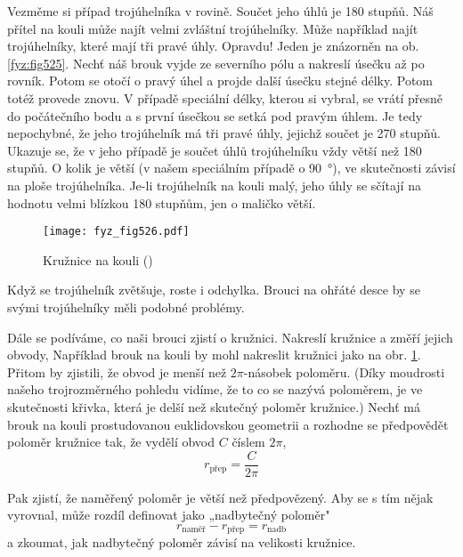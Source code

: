     Vezměme si případ trojúhelníka v rovině. Součet jeho úhlů je \num{180} stupňů. Náš přítel na 
    kouli může najít velmi zvláštní trojúhelníky. Může například najít trojúhelníky, které mají tři 
    pravé úhly. Opravdu! Jeden je znázorněn na ob. \ref{fyz:fig525}. Nechť náš brouk vyjde ze 
    severního pólu a nakreslí úsečku až po rovník. Potom se otočí o pravý úhel a projde další 
    úsečku stejné délky. Potom totéž provede znovu. V případě speciální délky, kterou si vybral, se 
    vrátí přesně do počátečního bodu a s první úsečkou se setká pod pravým úhlem. Je tedy 
    nepochybné, že jeho trojúhelník má tři pravé úhly, jejichž součet je \num{270} stupňů. Ukazuje 
    se, že v jeho případě je součet úhlů trojúhelníku vždy větší než \num{180} stupňů. O kolik je 
    větší (v našem speciálním případě o \SI{90}{\degree}), ve skutečnosti závisí na ploše 
    trojúhelníka. Je-li trojúhelník na kouli malý, jeho úhly se sčítají na hodnotu velmi blízkou 
    \num{180} stupňům, jen o maličko větší.
    
    \begin{figure}[ht!] %
      \centering
      \texttt{[image: fyz\_fig526.pdf]}
      \caption{Kružnice na kouli (\cite[s.~779]{Feynman02})}
      \label{fyz:fig526}
    \end{figure}
     
    Když se trojúhelník zvětšuje, roste i odchylka. Brouci na ohřáté desce by se svými trojúhelníky 
    měli podobné problémy.
    
    Dále se podíváme, co naši brouci zjistí o kružnici. Nakreslí kružnice a změří jejich obvody, 
    Například brouk na kouli by mohl nakreslit kružnici jako na obr. \ref{fyz:fig526}. Přitom by 
    zjistili, že obvod je menší než \(2\pi\)-násobek poloměru. (Díky moudrosti našeho 
    trojrozměrného pohledu vidíme, že to co se nazývá poloměrem, je ve skutečnosti křivka, která je 
    delší než skutečný poloměr kružnice.) Nechť má brouk na kouli prostudovanou euklidovskou 
    geometrii a rozhodne se předpovědět poloměr kružnice tak, že vydělí obvod \(C\) číslem \(2\pi\),
    \begin{equation}\label{fyz:eq528}
      r_{\text{přep}} = \dfrac{C}{2\pi}
    \end{equation}
    
    Pak zjistí, že naměřený poloměr je větší než předpovězený. Aby se s tím nějak vyrovnal, může 
    rozdíl definovat jako „nadbytečný poloměr"
    \begin{equation}\label{fyz:eq529}
      r_{\text{naměř}} - r_{\text{přep}} = r_{\text{nadb}}
    \end{equation}
    a zkoumat, jak nadbytečný poloměr závisí na velikosti kružnice. 
    
